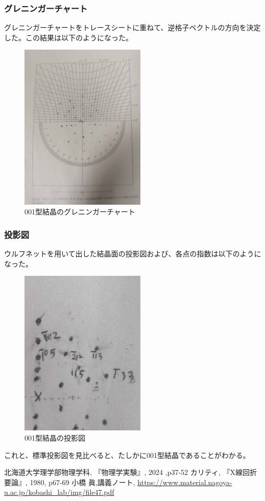 \documentclass[a4paper,11pt]{jsarticle}
\begin{document}
\subsubsection{グレニンガーチャート}
グレニンガーチャートをトレースシートに重ねて、逆格子ベクトルの方向を決定した。この結果は以下のようになった。
\begin{figure}[H]
  \centering
  \includegraphics[width=6cm]{001_gren.jpg}
  \caption{001型結晶のグレニンガーチャート}
\end{figure}

\subsubsection{投影図}
ウルフネットを用いて出した結晶面の投影図および、各点の指数は以下のようになった。
\begin{figure}[H]
  \centering
  \includegraphics[width=6cm]{001_wulf.jpg}
  \caption{001型結晶の投影図}
\end{figure}
これと、標準投影図を見比べると、たしかに001型結晶であることがわかる。




\begin{thebibliography}{99}
   北海道大学理学部物理学科, 『物理学実験』, 2024 ,p37-52
   カリティ, 『X線回折要論』, 1980, p67-69
   小橋 眞,講義ノート, \url{https://www.material.nagoya-u.ac.jp/kobashi_lab/img/file47.pdf}
\end{thebibliography}
\end{document}
